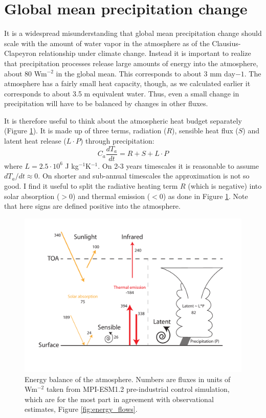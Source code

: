 \documentclass[12pt]{book}
\begin{document}
\section{Global mean precipitation change}
It is a widespread misunderstanding that global mean precipitation change should scale with the amount of water vapor in the atmosphere as of the Clausius-Clapeyron relationship under climate change. Instead it is important to realize that  precipitation processes release large amounts of energy into the atmosphere, about 80 Wm$^{-2}$ in the global mean. This corresponds to about 3 mm day${-1}$. The atmosphere has a fairly small heat capacity, though, as we calculated earlier it corresponds to about 3.5 m equivalent water. Thus, even a small change in precipitation will have to be balanced by changes in other fluxes. 

It is therefore useful to think about the atmospheric heat budget separately (Figure \ref{fig:energy_hydrological_cycles}). It is made up of three terms, radiation ($R$), sensible heat flux ($S$) and latent heat release ($L\cdot P$) through precipitation:
\begin{equation}
C_a\frac{dT_a}{dt} = R + S + L\cdot P
\label{eq:atmospheric_heat_budget}
\end{equation}
where $L=2.5\cdot 10^6$ J kg$^{-1}$K$^{-1}$. On 2-3 years timescales it is reasonable to assume $dT_a/dt\approx 0$. On shorter and sub-annual timescales the approximation is not so good. I find it useful to split the radiative heating term $R$ (which is negative) into solar absorption ($>0$) and thermal emission ($<0$) as done in Figure \ref{fig:energy_hydrological_cycles}. Note that here signs are defined positive into the atmosphere.

\begin{figure}
\begin{center}
\includegraphics[width=14 cm]{../Illustrations/Energy_hydrological_cycles.pdf}
\end{center}
\caption{ Energy balance of the atmosphere. Numbers are fluxes in units of Wm$^{-2}$ taken from MPI-ESM1.2 pre-industrial control simulation, which are for the most part in agreement with observational estimates, Figure \ref{fig:energy_flows}. } 
\label{fig:energy_hydrological_cycles}
\end{figure}
\end{document}
